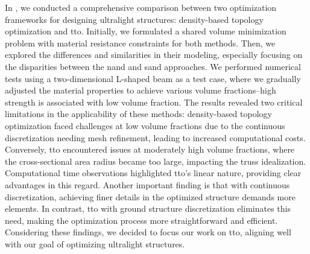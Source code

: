 In , we conducted a comprehensive comparison between two optimization frameworks for designing ultralight structures: density-based topology optimization and \gls{tto}. Initially, we formulated a shared volume minimization problem with material resistance constraints for both methods. Then, we explored the differences and similarities in their modeling, especially focusing on the disparities between the \gls{nand} and \gls{sand} approaches. We performed numerical tests using a two-dimensional L-shaped beam as a test case, where we gradually adjusted the material properties to achieve various volume fractions--\ie high strength is associated with low volume fraction. The results revealed two critical limitations in the applicability of these methods: density-based topology optimization faced challenges at low volume fractions due to the continuous discretization needing mesh refinement, leading to increased computational costs. Conversely, \gls{tto} encountered issues at moderately high volume fractions, where the cross-sectional area radius became too large, impacting the truss idealization. Computational time observations highlighted \gls{tto}'s linear nature, providing clear advantages in this regard. Another important finding is that with continuous discretization, achieving finer details in the optimized structure demands more elements. In contrast, \gls{tto} with ground structure discretization eliminates this need, making the optimization process more straightforward and efficient. Considering these findings, we decided to focus our work on \gls{tto}, aligning well with our goal of optimizing ultralight structures.

